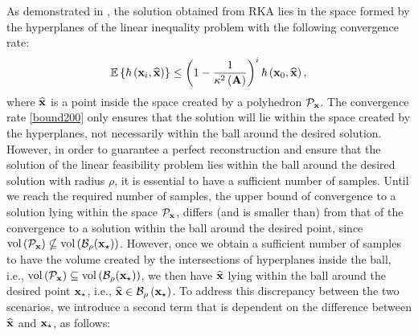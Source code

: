 \documentclass[12pt,draftcls,onecolumn]{IEEEtran}
\newcommand{\Fr}[1]{\textcolor{blue}{#1}}
\begin{document}
\begin{IEEEproof}
As demonstrated in \cite{leventhal2010randomized}, the solution obtained from RKA lies in the space formed by the hyperplanes of the linear inequality problem with the following convergence rate:
\begin{equation}
\label{bound200}
\begin{aligned}
\mathbb{E}\left\{\hbar\left(\mathbf{x}_{i},\widehat{\mathbf{x}}\right)\right\} \leq \left(1-\frac{1}{\kappa^{2}\left(\mbA\right)}\right)^{i} \hbar\left(\mathbf{x}_{0},\widehat{\mathbf{x}}\right),
\end{aligned}
\end{equation}
where $\widehat{\mathbf{x}}$ is a point inside the space created by a polyhedron $\mathcal{P}_{\mathbf{x}}$. The convergence rate \eqref{bound200} only ensures that the solution will lie within the space created by the hyperplanes, not necessarily within the ball around the desired solution. However, in order to guarantee a perfect reconstruction and ensure that the solution of the linear feasibility problem lies within the ball around the desired solution with radius $\rho$, it is essential to have a sufficient number of samples. Until we reach the required number of samples, the upper bound of convergence to a solution lying within the space $\mathcal{P}_{\mathbf{x}}$, differs (and is smaller than) from that of the convergence to a solution within the ball around the desired point, since $\operatorname{vol}\left(\mathcal{P}_{\mathbf{x}}\right) \nsubseteq \operatorname{vol}\left(\mathcal{B}_{\rho}(\mathbf{x}_{\star})\right)$. However, once we obtain a sufficient number of samples to have the volume created by the intersections of hyperplanes inside the ball, i.e., $\operatorname{vol}\left(\mathcal{P}_{\mathbf{x}}\right) \subseteq \operatorname{vol}\left(\mathcal{B}_{\rho}(\mathbf{x}_{\star})\right)$, we then have $\widehat{\mathbf{x}}$  lying within the ball around the desired point $\mathbf{x}_{\star}$, i.e., $\widehat{\mathbf{x}} \in \mathcal{B}_{\rho}\left(\mathbf{x}_{\star}\right)$. To address this discrepancy between the two scenarios, we introduce a second term that is dependent on the difference between $\widehat{\mathbf{x}}$ and $\mathbf{x}_{\star}$, as follows:

\end{IEEEproof}
\end{document}
